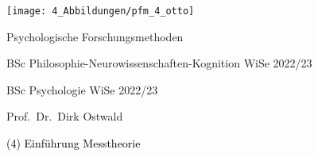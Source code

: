 \documentclass[
  8pt,
  ignorenonframetext,
]{beamer}
\author{}
\date{\vspace{-2.5em}}
\begin{document}
\begin{frame}[plain]{}
\protect\hypertarget{section}{}
\center

\begin{center}\texttt{[image: 4\_Abbildungen/pfm\_4\_otto]} \end{center}

\vspace{2mm}

\Large

Psychologische Forschungsmethoden \vspace{6mm}

\normalsize

BSc Philosophie-Neurowissenschaften-Kognition WiSe 2022/23

BSc Psychologie WiSe 2022/23

\large
\vspace{6mm}

Prof.~Dr.~Dirk Ostwald
\end{frame}

\begin{frame}[plain]{}
\protect\hypertarget{section-1}{}
\vfill
\center
\huge

\textcolor{black}{(4) Einführung Messtheorie} \vfill
\end{frame}
\end{document}
